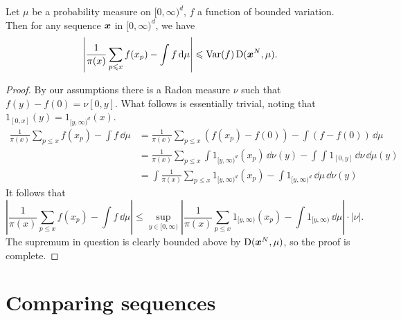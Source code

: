 \begin{theorem}
Let $\mu$ be a probability measure on $[0,\infty)^d$, $f$ a function of 
bounded variation. Then for any sequence ${\boldsymbol x}$ in $[0,\infty)^d$, we have 
\[
	\left| \frac{1}{\pi(x)} \sum_{p\leqslant x} f(x_p) - \int f\, \mathrm{d}\mu \right| \leqslant \operatorname{Var}(f) \operatorname{D}({\boldsymbol x}^N,\mu) .
\]
\end{theorem}
\begin{proof}
By our assumptions there is a Radon measure $\nu$ such that 
$f(y) - f(0) = \nu[0,y]$. What follows is essentially trivial, noting that 
$1_{[0,x]}(y) = 1_{[y,\infty)^d}(x)$. 
\begin{align*}
	\frac{1}{\pi(x)} \sum_{p\leqslant x} f(x_p) - \int f\, \dd\mu 
		&= \frac{1}{\pi(x)} \sum_{p\leqslant x} \left(f(x_p) - f(0)\right) - \int \left(f - f(0)\right)\, \dd\mu \\
		&= \frac{1}{\pi(x)} \sum_{p\leqslant x} \int 1_{[y,\infty)^d}(x_p)\, \dd \nu(y) - \int \int 1_{[0,y]}\, \dd\nu \, \dd\mu(y) \\
		&= \int \frac{1}{\pi(x)} \sum_{p\leqslant x} 1_{[y,\infty)^d}(x_p) - \int 1_{[y,\infty)^d}\, \dd\mu \, \dd\nu(y)
\end{align*}
It follows that 
\[
	\left| \frac{1}{\pi(x)} \sum_{p\leqslant x} f(x_p) - \int f\, \dd\mu \right|
		\leqslant \sup_{y\in [0,\infty)} \left| \frac{1}{\pi(x)} \sum_{p\leqslant x} 1_{[y,\infty)}(x_p) - \int 1_{[y,\infty)}\, \dd\mu\right| \cdot |\nu| .
\]
The supremum in question is clearly bounded above by $\operatorname{D}({\boldsymbol x}^N,\mu)$, so the 
proof is complete. 
\end{proof}





\section{Comparing sequences}

